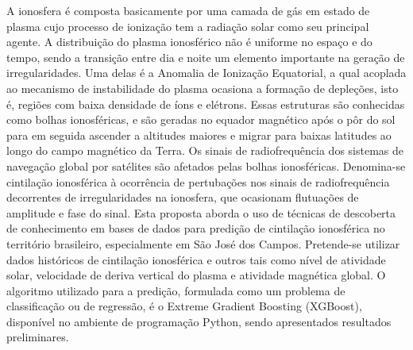 
\begin{resumo}


\hypertarget{estilo:resumo}{} %

A ionosfera é composta basicamente por uma camada de gás em estado de plasma cujo  processo de ionização tem a radiação solar como seu principal agente. A distribuição do plasma ionosférico não é uniforme no espaço e do tempo, sendo a transição entre dia e noite  um elemento importante na geração de irregularidades.  Uma delas é a Anomalia de Ionização Equatorial, a qual acoplada ao mecanismo de instabilidade do plasma ocasiona a formação de depleções, isto é, regiões com baixa densidade de íons e elétrons. Essas estruturas são conhecidas como bolhas ionosféricas, e são geradas no equador magnético após o pôr do sol para em seguida ascender a altitudes maiores e migrar para baixas latitudes ao longo do campo magnético da Terra. Os sinais de radiofrequência dos sistemas de navegação global por satélites são afetados pelas bolhas ionosféricas. Denomina-se cintilação ionosférica à ocorrência de pertubações nos sinais de radiofrequência decorrentes de irregularidades na ionosfera, que ocasionam flutuações de amplitude e fase do sinal. Esta proposta aborda o uso de técnicas de descoberta de conhecimento em bases de dados para predição de cintilação ionosférica no território brasileiro, especialmente em São José dos Campos. Pretende-se utilizar dados históricos de cintilação ionosférica e outros tais como nível de atividade solar, velocidade de deriva vertical do plasma e atividade magnética global. O algoritmo utilizado para a predição, formulada como um problema de classificação ou de regressão, é o Extreme Gradient Boosting (XGBoost), disponível no ambiente de programação Python, sendo apresentados resultados preliminares.

 
\end{resumo}
